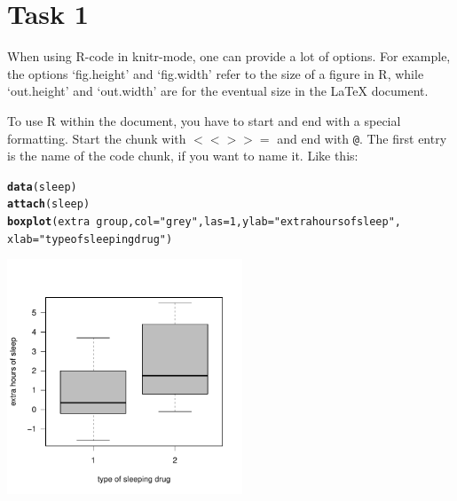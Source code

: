 \documentclass[a4paper, 11pt]{article}\usepackage[]{graphicx}\usepackage[]{color}
\makeatletter
\newcommand{\hlnum}[1]{\textcolor[rgb]{0.686,0.059,0.569}{#1}}%
\newcommand{\hlstr}[1]{\textcolor[rgb]{0.192,0.494,0.8}{#1}}%
\newcommand{\hlopt}[1]{\textcolor[rgb]{0,0,0}{#1}}%
\newcommand{\hlstd}[1]{\textcolor[rgb]{0.345,0.345,0.345}{#1}}%
\newcommand{\hlkwc}[1]{\textcolor[rgb]{0.333,0.667,0.333}{#1}}%
\newcommand{\hlkwd}[1]{\textcolor[rgb]{0.737,0.353,0.396}{\textbf{#1}}}%
\newenvironment{kframe}{%
 \def\at@end@of@kframe{}%
 \ifinner\ifhmode%
  \def\at@end@of@kframe{\end{minipage}}%
  \begin{minipage}{\columnwidth}%
 \fi\fi%
 \def\FrameCommand##1{\hskip\@totalleftmargin \hskip-\fboxsep
 \colorbox{shadecolor}{##1}\hskip-\fboxsep
     \hskip-\linewidth \hskip-\@totalleftmargin \hskip\columnwidth}%
 \MakeFramed {\advance\hsize-\width
   \@totalleftmargin\z@ \linewidth\hsize
   \@setminipage}}%
 {\par\unskip\endMakeFramed%
 \at@end@of@kframe}
\newenvironment{knitrout}{}{} %
\makeatother
\begin{document}
\section{Task 1}
When using R-code in knitr-mode, one can provide a lot of options. For example, the options `fig.height' and `fig.width' refer to the size of a figure in R, while `out.height' and `out.width' are for the eventual size in the \LaTeX\/ document.

To use R within the document, you have to start and end with a special formatting. Start the chunk with \texttt{$<< >>=$} and end with \texttt{@}. The first entry is the name of the code chunk, if you want to name it. Like this:
\begin{knitrout}\small
{}\color{fgcolor}\begin{kframe}
\begin{alltt}
\hlkwd{data}\hlstd{(sleep)}
\hlkwd{attach}\hlstd{(sleep)}
\hlkwd{boxplot}\hlstd{(extra} \hlopt{~} \hlstd{group,} \hlkwc{col}\hlstd{=}\hlstr{"grey"}\hlstd{,} \hlkwc{las}\hlstd{=}\hlnum{1}\hlstd{,} \hlkwc{ylab}\hlstd{=}\hlstr{"extra hours of sleep"}\hlstd{,}
          \hlkwc{xlab}\hlstd{=}\hlstr{"type of sleeping drug"}\hlstd{)}
\end{alltt}
\end{kframe}

{\centering \includegraphics[width=7cm,height=7cm]{figure/example1-1} 

}



\end{knitrout}
\end{document}

